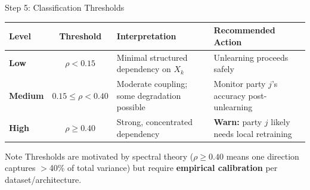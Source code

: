 \documentclass[aspectratio=169, 11pt]{beamer}
\begin{document}
\begin{frame}{Step 5: Classification Thresholds}
  \begin{center}
    \renewcommand{\arraystretch}{1.5}
    \begin{tabular}{>{\bfseries\small}l >{\small}c >{\small}p{4.5cm} >{\small}p{4.5cm}}
      \toprule
      \textbf{Level} & \textbf{Threshold} & \textbf{Interpretation} & \textbf{Recommended Action} \\
      \midrule
      \rowcolor{softgreen!15}
      Low & $\rho < 0.15$ & Minimal structured dependency on $X_k$ & Unlearning proceeds safely \\
      \rowcolor{orange!15}
      Medium & $0.15 \leq \rho < 0.40$ & Moderate coupling; some degradation possible & Monitor party $j$'s accuracy post-unlearning \\
      \rowcolor{accentred!15}
      High & $\rho \geq 0.40$ & Strong, concentrated dependency & \textbf{Warn:} party $j$ likely needs local retraining \\
      \bottomrule
    \end{tabular}
  \end{center}
  \vspace{0.3cm}
  \begin{alertblock}{Note}
    Thresholds are motivated by spectral theory ($\rho \geq 0.40$ means one direction captures $>$40\% of total variance) but require \textbf{empirical calibration} per dataset/architecture.
  \end{alertblock}
\end{frame}
\end{document}
